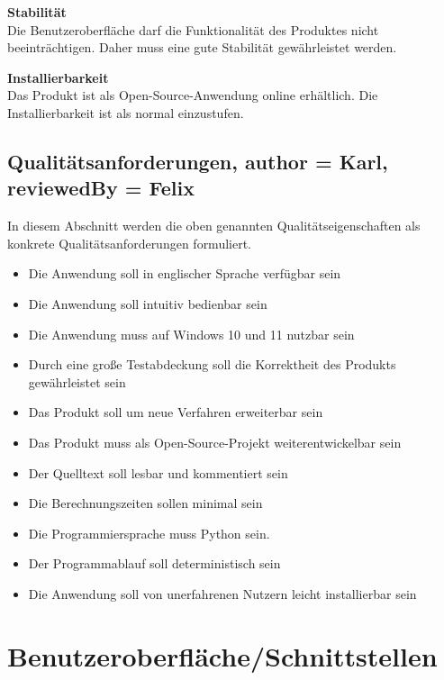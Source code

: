 \documentclass[parskip=full]{scrartcl} %
\begin{document}
\textbf{Stabilität}\\
Die Benutzeroberfläche darf die Funktionalität des Produktes nicht beeinträchtigen. Daher muss eine gute Stabilität gewährleistet werden.

\textbf{Installierbarkeit}\\
Das Produkt ist als Open-Source-Anwendung online erhältlich. Die Installierbarkeit ist als normal einzustufen.


\newpage 


\subsection{Qualitätsanforderungen, author = Karl, reviewedBy = Felix}
In diesem Abschnitt werden die oben genannten Qualitätseigenschaften als konkrete Qualitätsanforderungen formuliert.

\begin{itemize}
    \item <Q1> Die Anwendung soll in englischer Sprache verfügbar sein
    \item <Q2> Die Anwendung soll intuitiv bedienbar sein
    \item <Q3> Die Anwendung muss auf Windows 10 und 11 nutzbar sein
    \item <Q4> Durch eine große Testabdeckung soll die Korrektheit des Produkts gewährleistet sein
    \item <Q5> Das Produkt soll um neue Verfahren erweiterbar sein
    \item <Q6> Das Produkt muss als Open-Source-Projekt weiterentwickelbar sein
    \item <Q7> Der Quelltext soll lesbar und kommentiert sein
    \item <Q8> Die Berechnungszeiten sollen minimal sein
    \item <Q9> Die Programmiersprache muss Python sein.
    \item <Q10> Der Programmablauf soll deterministisch sein
    \item <Q11> Die Anwendung soll von unerfahrenen Nutzern leicht installierbar sein
\end{itemize}

\newpage



\section{Benutzeroberfläche/Schnittstellen}
\newpage
\end{document}
